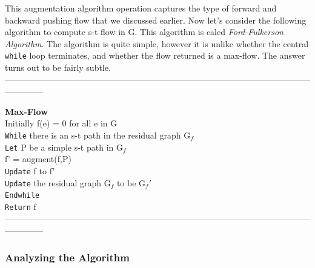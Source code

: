 \documentclass{article}
\begin{document}
This augmentation algorithm operation captures the type of forward and backward pushing flow that we discussed earlier. Now let's consider the following algorithm to compute s-t flow in G. This algorithm is caled \emph{Ford-Fulkerson Algorithm}. The algorithm is quite simple, however it is unlike whether the central \texttt{while} loop terminates, and whether the flow returned is a max-flow. The answer turns out to be fairly subtle.\\

\medskip
--------------------------------------------------------------------------------------------------------------------------
\medskip

\textbf{Max-Flow}\\
Initially f(e) = 0 for all e in G\\
\texttt{While} there is an s-t path in the residual graph G$_f$\\
\texttt{Let} P be a simple s-t path in G$_f$\\
f' = augment(f,P)\\
\texttt{Update} f to f'\\
\texttt{Update} the residual graph G$_f$ to be G$_f'$\\
\texttt{Endwhile}\\
\texttt{Return} f\\


\medskip
--------------------------------------------------------------------------------------------------------------------------
\medskip

\subsubsection{Analyzing the Algorithm}

\\

\medskip

\\
\end{document}
